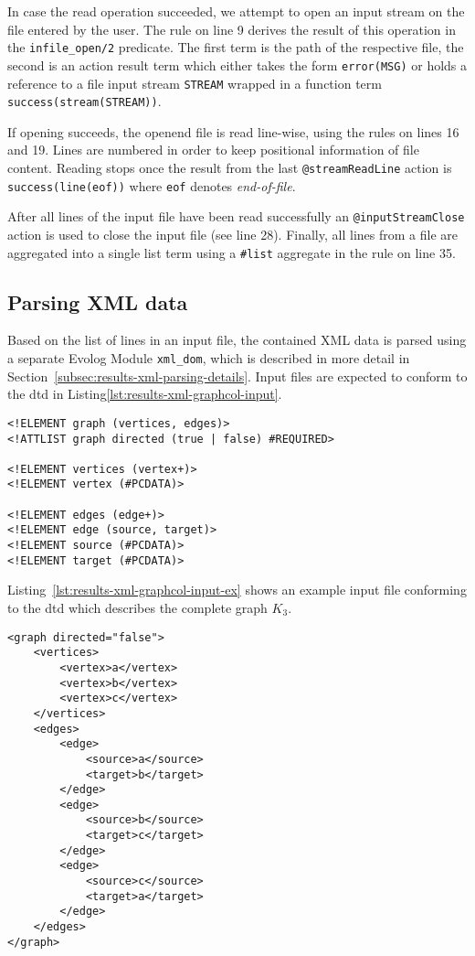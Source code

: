 In case the read operation succeeded, we attempt to open an input stream on the file entered by the user. The rule on line 9 derives the result of this operation in the \texttt{infile\_open/2} predicate. The first term is the path of the respective file, the second is an action result term which either takes the form \texttt{error(MSG)} or holds a reference to a file input stream \texttt{STREAM} wrapped in a function term \texttt{success(stream(STREAM))}.

If opening succeeds, the openend file is read line-wise, using the rules on lines 16 and 19. Lines are numbered in order to keep positional information of file content. Reading stops once the result from the last \texttt{@streamReadLine} action is \texttt{success(line(eof))} where \texttt{eof} denotes \emph{end-of-file}.

After all lines of the input file have been read successfully an \texttt{@inputStreamClose} action is used to close the input file (see line 28). Finally, all lines from a file are aggregated into a single list term using a \texttt{\#list} aggregate in the rule on line 35.

\subsection{Parsing XML data}
\label{subsec:results-xml-parsing}

Based on the list of lines in an input file, the contained XML data is parsed using a separate Evolog Module \texttt{xml\_dom}, which is described in more detail in Section~\ref{subsec:results-xml-parsing-details}. Input files are expected to conform to the \gls{dtd} in Listing\ref{lst:results-xml-graphcol-input}.

\begin{lstlisting}[style=asp-code, label={lst:results-xml-graphcol-input}, caption={\gls{dtd} for graph XML files.}]  
<!ELEMENT graph (vertices, edges)>
<!ATTLIST graph directed (true | false) #REQUIRED>

<!ELEMENT vertices (vertex+)>
<!ELEMENT vertex (#PCDATA)>

<!ELEMENT edges (edge+)>
<!ELEMENT edge (source, target)>
<!ELEMENT source (#PCDATA)>
<!ELEMENT target (#PCDATA)>    
\end{lstlisting}    

Listing~\ref{lst:results-xml-graphcol-input-ex} shows an example input file conforming to the \gls{dtd} which describes the complete graph $K_3$.

\begin{lstlisting}[style=asp-code, label={lst:results-xml-graphcol-input-ex}, caption={The complete graph $K_3$ represented according to the \gls{dtd} from Listing~\ref{lst:results-xml-graphcol-input}.}]
<graph directed="false">
    <vertices>
        <vertex>a</vertex>
        <vertex>b</vertex>
        <vertex>c</vertex>
    </vertices>
    <edges>
        <edge>
            <source>a</source>
            <target>b</target>
        </edge>
        <edge>
            <source>b</source>
            <target>c</target>
        </edge>
        <edge>
            <source>c</source>
            <target>a</target>
        </edge>
    </edges>    
</graph>
\end{lstlisting} 


